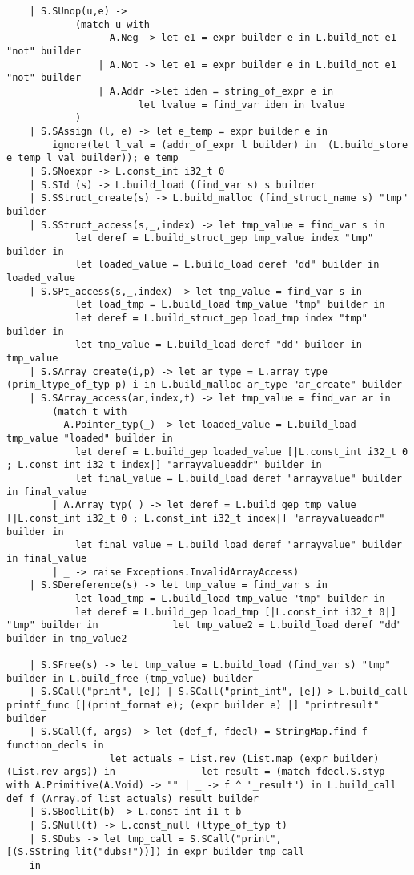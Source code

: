 \documentclass{article}
\begin{document}
\begin{lstlisting}
	| S.SUnop(u,e) -> 
			(match u with
				  A.Neg -> let e1 = expr builder e in L.build_not e1 "not" builder
				| A.Not -> let e1 = expr builder e in L.build_not e1 "not" builder
				| A.Addr ->let iden = string_of_expr e in 
					   let lvalue = find_var iden in lvalue
			)
	| S.SAssign (l, e) -> let e_temp = expr builder e in 
		ignore(let l_val = (addr_of_expr l builder) in  (L.build_store e_temp l_val builder)); e_temp
	| S.SNoexpr -> L.const_int i32_t 0
	| S.SId (s) -> L.build_load (find_var s) s builder
	| S.SStruct_create(s) -> L.build_malloc (find_struct_name s) "tmp" builder
	| S.SStruct_access(s,_,index) -> let tmp_value = find_var s in 
			let deref = L.build_struct_gep tmp_value index "tmp" builder in 
			let loaded_value = L.build_load deref "dd" builder in loaded_value
	| S.SPt_access(s,_,index) -> let tmp_value = find_var s in 
			let load_tmp = L.build_load tmp_value "tmp" builder in 
			let deref = L.build_struct_gep load_tmp index "tmp" builder in 
			let tmp_value = L.build_load deref "dd" builder in tmp_value
	| S.SArray_create(i,p) -> let ar_type = L.array_type (prim_ltype_of_typ p) i in L.build_malloc ar_type "ar_create" builder 
	| S.SArray_access(ar,index,t) -> let tmp_value = find_var ar in 
		(match t with 
		  A.Pointer_typ(_) -> let loaded_value = L.build_load tmp_value "loaded" builder in  
			let deref = L.build_gep loaded_value [|L.const_int i32_t 0 ; L.const_int i32_t index|] "arrayvalueaddr" builder in 
			let final_value = L.build_load deref "arrayvalue" builder in final_value 
		| A.Array_typ(_) -> let deref = L.build_gep tmp_value [|L.const_int i32_t 0 ; L.const_int i32_t index|] "arrayvalueaddr" builder in 
			let final_value = L.build_load deref "arrayvalue" builder in final_value 
		| _ -> raise Exceptions.InvalidArrayAccess)
	| S.SDereference(s) -> let tmp_value = find_var s in 
			let load_tmp = L.build_load tmp_value "tmp" builder in 
			let deref = L.build_gep load_tmp [|L.const_int i32_t 0|] "tmp" builder in 			  let tmp_value2 = L.build_load deref "dd" builder in tmp_value2

	| S.SFree(s) -> let tmp_value = L.build_load (find_var s) "tmp" builder in L.build_free (tmp_value) builder
	| S.SCall("print", [e]) | S.SCall("print_int", [e])-> L.build_call printf_func [|(print_format e); (expr builder e) |] "printresult" builder
	| S.SCall(f, args) -> let (def_f, fdecl) = StringMap.find f function_decls in
			      let actuals = List.rev (List.map (expr builder) (List.rev args)) in 				let result = (match fdecl.S.styp with A.Primitive(A.Void) -> "" | _ -> f ^ "_result") in L.build_call def_f (Array.of_list actuals) result builder
	| S.SBoolLit(b) -> L.const_int i1_t b
	| S.SNull(t) -> L.const_null (ltype_of_typ t)
	| S.SDubs -> let tmp_call = S.SCall("print", [(S.SString_lit("dubs!"))]) in expr builder tmp_call 	
	in



\end{lstlisting}
\end{document}
